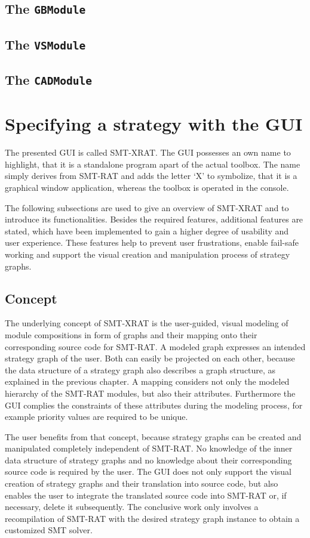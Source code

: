 \subsection{The \texttt{GBModule}}
\subsection{The \texttt{VSModule}}
\subsection{The \texttt{CADModule}}

\section{Specifying a strategy with the GUI}

The presented GUI is called SMT-XRAT. The GUI possesses an own name to highlight, that it is a standalone program apart of the actual toolbox. The name simply derives from SMT-RAT and adds the letter `X' to symbolize, that it is a graphical window application, whereas the toolbox is operated in the console.

The following subsections are used to give an overview of SMT-XRAT and to introduce its functionalities. Besides the required features, additional features are stated, which have been implemented to gain a higher degree of usability and user experience. These features help to prevent user frustrations, enable fail-safe working and support the visual creation and manipulation process of strategy graphs.

\subsection{Concept}
\label{sec:concept_of_smt-xrat}
The underlying concept of SMT-XRAT is the user-guided, visual modeling of module compositions in form of graphs and their mapping onto their corresponding source code for SMT-RAT. A modeled graph expresses an intended strategy graph of the user. Both can easily be projected on each other, because the data structure of a strategy graph also describes a graph structure, as explained in the previous chapter. A mapping considers not only the modeled hierarchy of the SMT-RAT modules, but also their attributes. Furthermore the GUI complies the constraints of these attributes during the modeling process, for example priority values are required to be unique.

The user benefits from that concept, because strategy graphs can be created and manipulated completely independent of SMT-RAT. No knowledge of the inner data structure of strategy graphs and no knowledge about their corresponding source code is required by the user. The GUI does not only support the visual creation of strategy graphs and their translation into source code, but also enables the user to integrate the translated source code into SMT-RAT or, if necessary, delete it subsequently. The conclusive work only involves a recompilation of SMT-RAT with the desired strategy graph instance to obtain a customized SMT solver.

